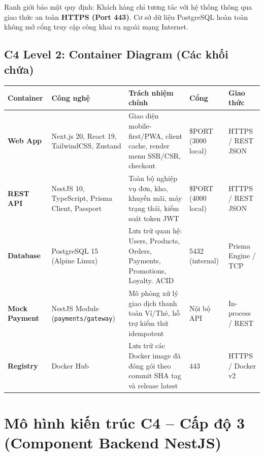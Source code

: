 \documentclass[11pt, a4paper]{article}
\begin{document}
Ranh giới bảo mật quy định: Khách hàng chỉ tương tác với hệ thống thông qua giao thức an toàn \textbf{HTTPS (Port 443)}. Cơ sở dữ liệu PostgreSQL hoàn toàn không mở cổng truy cập công khai ra ngoài mạng Internet.

\subsection{C4 Level 2: Container Diagram (Các khối chứa)}

\begin{table}[h!]
	\small
	\centering
	\begin{tabular}{p{2.6cm} p{3.2cm} p{4.8cm} p{1.6cm} p{2.5cm}}
		\toprule
		\rowcolor{tableheader}
		\textbf{Container}    & \textbf{Công nghệ}                             & \textbf{Trách nhiệm chính}                                                    & \textbf{Cổng}       & \textbf{Giao thức}  \\
		\midrule
		\textbf{Web App}      & Next.js 20, React 19, TailwindCSS, Zustand     & Giao diện mobile-first/PWA, client cache, render menu SSR/CSR, checkout       & \$PORT (3000 local) & HTTPS / REST JSON   \\
		\textbf{REST API}     & NestJS 10, TypeScript, Prisma Client, Passport & Toàn bộ nghiệp vụ đơn, kho, khuyến mãi, máy trạng thái, kiểm soát token JWT   & \$PORT (4000 local) & HTTPS / REST JSON   \\
		\textbf{Database}     & PostgreSQL 15 (Alpine Linux)                   & Lưu trữ quan hệ: Users, Products, Orders, Payments, Promotions, Loyalty. ACID & 5432 (internal)     & Prisma Engine / TCP \\
		\textbf{Mock Payment} & NestJS Module (\texttt{payments/gateway})      & Mô phỏng xử lý giao dịch thanh toán Ví/Thẻ, hỗ trợ kiểm thử idempotent        & Nội bộ API          & In-process / REST   \\
		\textbf{Registry}     & Docker Hub                                     & Lưu trữ các Docker image đã đóng gói theo commit SHA tag và release latest    & 443                 & HTTPS / Docker v2   \\
		\bottomrule
	\end{tabular}
\end{table}

\section{Mô hình kiến trúc C4 -- Cấp độ 3 (Component Backend NestJS)}
\end{document}
